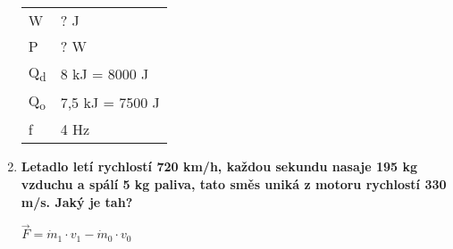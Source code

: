 \documentclass[../main.tex]{subfiles}
\begin{document}
\begin{enumerate}[label={\textbf{\arabic*.}}, resume]
    \begin{minipage}[]{0.5\textwidth}
        \begin{center}
            \textcolor{red}{
            \begin{tabular}{l l}
                W & ? J\\
                P & ? W\\
                Q\textsubscript{d} & 8 kJ = 8000 J\\
                Q\textsubscript{o} & 7,5 kJ = 7500 J\\
                f & 4 Hz
            \end{tabular}
            }
        \end{center}
    \end{minipage}%
    \begin{minipage}{0.5\textwidth}
    \end{minipage}

    \dotfill
    

    \item \textbf{Letadlo letí rychlostí 720 km/h, každou sekundu nasaje 195 kg vzduchu a spálí 5 kg paliva, tato směs uniká z motoru rychlostí 330 m/s. Jaký je tah?}
    \vspace{-0.75cm}
    \begin{flushright}
        \begin{minipage}{0.25\textwidth}
            \begin{tcolorbox}[colframe=black, colback=white, boxrule=0.6pt]
                {\(\vec{F}=\dot{m}_{1}\cdot{v_1}-\dot{m}_{0}\cdot{v_0}\)}
            \end{tcolorbox}
        \end{minipage}
    \end{flushright}


\end{enumerate}
\end{document}
